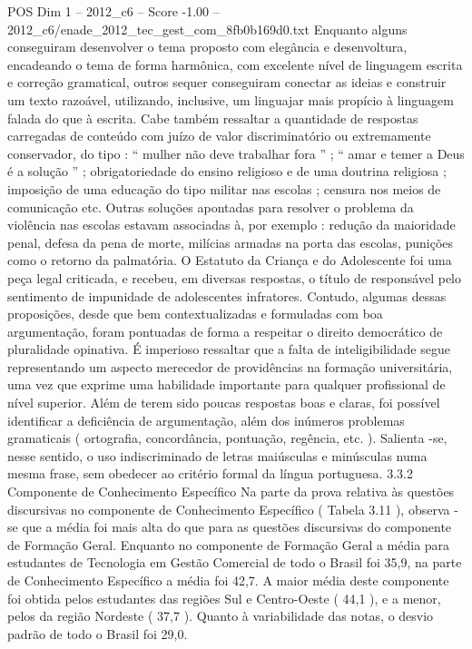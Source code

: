 \begin{textsample}{POS Dim 1 – 2012\_c6 – Score -1.00 – 2012\_c6/enade\_2012\_tec\_gest\_com\_8fb0b169d0.txt}
Enquanto alguns conseguiram desenvolver o tema proposto com elegância e desenvoltura, encadeando o tema de forma harmônica, com excelente nível de linguagem escrita e correção gramatical, outros sequer conseguiram conectar as ideias e construir um texto razoável, utilizando, inclusive, um linguajar mais propício à linguagem falada do que à escrita.
Cabe também ressaltar a quantidade de respostas carregadas de conteúdo com juízo de valor discriminatório ou extremamente conservador, do tipo : “ mulher não deve trabalhar fora ” ; “ amar e temer a Deus é a solução ” ; obrigatoriedade do ensino religioso e de uma doutrina religiosa ; imposição de uma educação do tipo militar nas escolas ; censura nos meios de comunicação etc.
Outras soluções apontadas para resolver o problema da violência nas escolas estavam associadas à, por exemplo : redução da maioridade penal, defesa da pena de morte, milícias armadas na porta das escolas, punições como o retorno da palmatória.
O Estatuto da Criança e do Adolescente foi uma peça legal criticada, e recebeu, em diversas respostas, o título de responsável pelo sentimento de impunidade de adolescentes infratores.
Contudo, algumas dessas proposições, desde que bem contextualizadas e formuladas com boa argumentação, foram pontuadas de forma a respeitar o direito democrático de pluralidade opinativa.
É imperioso ressaltar que a falta de inteligibilidade segue representando um aspecto merecedor de providências na formação universitária, uma vez que exprime uma habilidade importante para qualquer profissional de nível superior.
Além de terem sido poucas respostas boas e claras, foi possível identificar a deficiência de argumentação, além dos inúmeros problemas gramaticais ( ortografia, concordância, pontuação, regência, etc. ).
Salienta -se, nesse sentido, o uso indiscriminado de letras maiúsculas e minúsculas numa mesma frase, sem obedecer ao critério formal da língua portuguesa. 3.3.2 Componente de Conhecimento Específico Na parte da prova relativa às questões discursivas no componente de Conhecimento Específico ( Tabela 3.11 ), observa -se que a média foi mais alta do que para as questões discursivas do componente de Formação Geral.
Enquanto no componente de Formação Geral a média para estudantes de Tecnologia em Gestão Comercial de todo o Brasil foi 35,9, na parte de Conhecimento Específico a média foi 42,7.
A maior média deste componente foi obtida pelos estudantes das regiões Sul e Centro-Oeste ( 44,1 ), e a menor, pelos da região Nordeste ( 37,7 ).
Quanto à variabilidade das notas, o desvio padrão de todo o Brasil foi 29,0.

\end{textsample}
